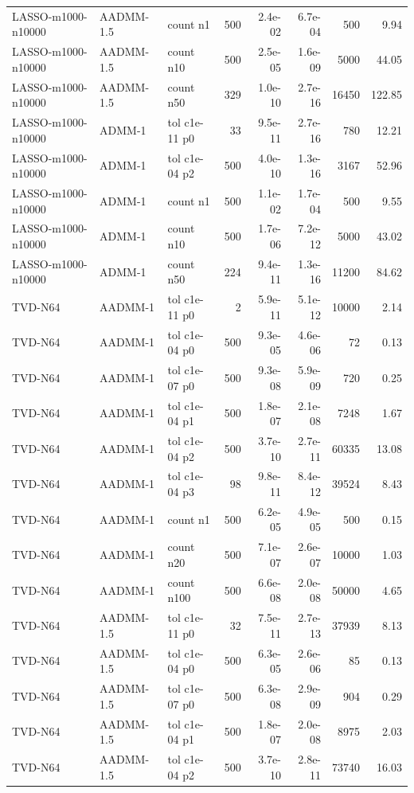 \begin{tabular}{lllrrrrr}
LASSO-m1000-n10000 & AADMM-1.5 & count n1 & 500 & 2.4e-02 & 6.7e-04 & 500 & 9.94\\
LASSO-m1000-n10000 & AADMM-1.5 & count n10 & 500 & 2.5e-05 & 1.6e-09 & 5000 & 44.05\\
LASSO-m1000-n10000 & AADMM-1.5 & count n50 & 329 & 1.0e-10 & 2.7e-16 & 16450 & 122.85\\
LASSO-m1000-n10000 & ADMM-1 & tol c1e-11 p0 & 33 & 9.5e-11 & 2.7e-16 & 780 & 12.21\\
LASSO-m1000-n10000 & ADMM-1 & tol c1e-04 p2 & 500 & 4.0e-10 & 1.3e-16 & 3167 & 52.96\\
LASSO-m1000-n10000 & ADMM-1 & count n1 & 500 & 1.1e-02 & 1.7e-04 & 500 & 9.55\\
LASSO-m1000-n10000 & ADMM-1 & count n10 & 500 & 1.7e-06 & 7.2e-12 & 5000 & 43.02\\
LASSO-m1000-n10000 & ADMM-1 & count n50 & 224 & 9.4e-11 & 1.3e-16 & 11200 & 84.62\\
TVD-N64 & AADMM-1 & tol c1e-11 p0 & 2 & 5.9e-11 & 5.1e-12 & 10000 & 2.14\\
TVD-N64 & AADMM-1 & tol c1e-04 p0 & 500 & 9.3e-05 & 4.6e-06 & 72 & 0.13\\
TVD-N64 & AADMM-1 & tol c1e-07 p0 & 500 & 9.3e-08 & 5.9e-09 & 720 & 0.25\\
TVD-N64 & AADMM-1 & tol c1e-04 p1 & 500 & 1.8e-07 & 2.1e-08 & 7248 & 1.67\\
TVD-N64 & AADMM-1 & tol c1e-04 p2 & 500 & 3.7e-10 & 2.7e-11 & 60335 & 13.08\\
TVD-N64 & AADMM-1 & tol c1e-04 p3 & 98 & 9.8e-11 & 8.4e-12 & 39524 & 8.43\\
TVD-N64 & AADMM-1 & count n1 & 500 & 6.2e-05 & 4.9e-05 & 500 & 0.15\\
TVD-N64 & AADMM-1 & count n20 & 500 & 7.1e-07 & 2.6e-07 & 10000 & 1.03\\
TVD-N64 & AADMM-1 & count n100 & 500 & 6.6e-08 & 2.0e-08 & 50000 & 4.65\\
TVD-N64 & AADMM-1.5 & tol c1e-11 p0 & 32 & 7.5e-11 & 2.7e-13 & 37939 & 8.13\\
TVD-N64 & AADMM-1.5 & tol c1e-04 p0 & 500 & 6.3e-05 & 2.6e-06 & 85 & 0.13\\
TVD-N64 & AADMM-1.5 & tol c1e-07 p0 & 500 & 6.3e-08 & 2.9e-09 & 904 & 0.29\\
TVD-N64 & AADMM-1.5 & tol c1e-04 p1 & 500 & 1.8e-07 & 2.0e-08 & 8975 & 2.03\\
TVD-N64 & AADMM-1.5 & tol c1e-04 p2 & 500 & 3.7e-10 & 2.8e-11 & 73740 & 16.03\\

\end{tabular}
